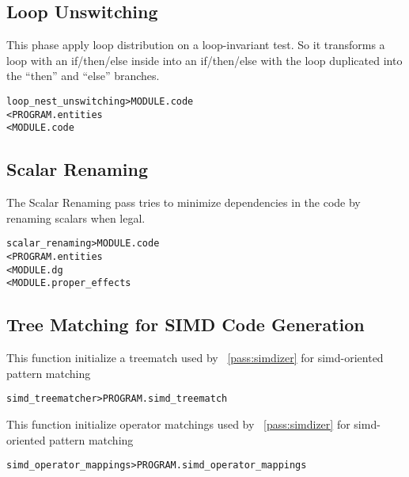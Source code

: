 \documentclass[a4paper]{report}
\newenvironment{PipsMake}{\begin{alltt}}{\end{alltt}}
\newcommand{\PipsPassRef}[1]{\texttt{\detokenize{#1}}~\ref{pass:#1}}
\newenvironment{PipsPass}[1]{\label{pass:#1}}{}
\begin{document}
\subsection{Loop Unswitching}

\begin{PipsPass}{loop_nest_unswitching}
  This phase apply loop distribution on a loop-invariant test. So it
  transforms a loop with an if/then/else inside into an if/then/else with
  the loop duplicated into the ``then'' and ``else'' branches.
\end{PipsPass}

\begin{PipsMake}
loop_nest_unswitching                  > MODULE.code
        < PROGRAM.entities
        < MODULE.code
\end{PipsMake}

\subsection{Scalar Renaming}

\begin{PipsPass}{scalar_renaming}
The Scalar Renaming pass tries to minimize dependencies in the code by
renaming scalars when legal.
\end{PipsPass}

\begin{PipsMake}
scalar_renaming           > MODULE.code
        < PROGRAM.entities
        < MODULE.dg
        < MODULE.proper_effects
\end{PipsMake}

\subsection{Tree Matching for SIMD Code Generation}

\begin{PipsPass}{simd_treematcher}
This function initialize a treematch used by \PipsPassRef{simdizer} for simd-oriented pattern matching
\end{PipsPass}
\begin{PipsMake}
simd_treematcher > PROGRAM.simd_treematch
\end{PipsMake}
\begin{PipsPass}{simd_operator_mappings}
This function initialize operator matchings used by \PipsPassRef{simdizer} for simd-oriented pattern matching
\end{PipsPass}
\begin{PipsMake}
simd_operator_mappings > PROGRAM.simd_operator_mappings
\end{PipsMake}
\end{document}
